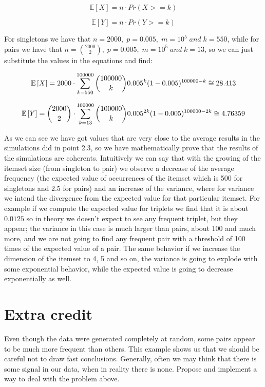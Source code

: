 \documentclass{article}
\begin{document}
$$\mathbb{E} \left[ X \right] = n \cdot Pr(X >= k)$$

$$\mathbb{E} \left[ Y \right] = n \cdot Pr(Y >= k)$$

For singletons we have that $n=2000, \; p=0.005, \; m=10^5 \; and \; k=550$, while for pairs we have that $n={2000 \choose 2}, \; p=0.005, \; m=10^5 \; and \; k=13$, 
so we can just substitute the values in the equations and find:


\begin{equation} {\label{eq:expectedx}}
\mathbb{E} \left[ X \right] = 2000 \cdot \sum_{k=550}^{100000} {100000 \choose k} 0.005^k (1-0.005)^{100000-k} \cong 28.413
\end{equation}

\begin{equation} {\label{eq:expectedx}}
\mathbb{E} \left[ Y \right] = {2000 \choose 2} \cdot \sum_{k=13}^{100000} {100000 \choose k} 0.005^{2k} (1-0.005)^{100000-2k} \cong 4.76359
\end{equation}

As we can see we have got values that are very close to the average results in the simulations did in point 2.3, so we have mathematically prove that the results of the simulations are coherents.
Intuitively we can say that with the growing of the itemset size (from singleton to pair) we observe a decrease of the average frequency (the expected value of occurrences of the itemset which is
500 for singletons and 2.5 for pairs) and an increase of the variance, where for variance we intend the divergence from the expected value for that particular itemset. For example if we compute the expected value for 
triplets we find that it is about $0.0125$ so in theory we doesn't expect to see any frequent triplet, but they appear; the variance in this case is much larger than pairs, about 100 and much more, and we are not going
to find any frequent pair with a threshold of 100 times of the expected value of a pair. The same behavior if we increase the dimension of the itemset to 4, 5 and so on, the variance is going to explode with some exponential behavior,
while the expected value is going to decrease exponentially as well.







\section{Extra credit}
Even though the data were generated completely at random, some pairs appear to be much more frequent than others. This example shows us that we should be careful not to draw fast conclusions. Generally, often we may think that there is some signal in our data, when in reality there is none. Propose and implement a way to deal with the problem above.
\end{document}
